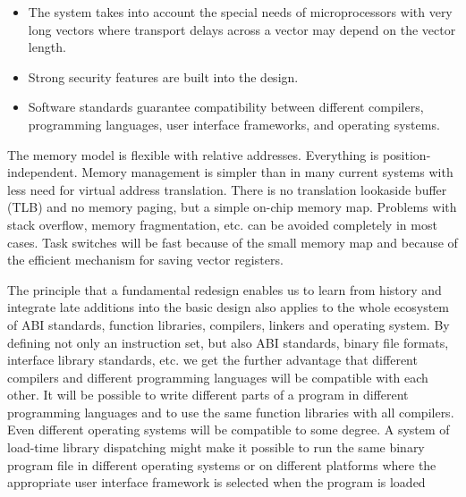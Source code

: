 \documentclass[forwardcom.tex]{subfiles}
\begin{document}
\begin{itemize}
\item The system takes into account the special needs of microprocessors with very long vectors where transport delays across a vector may depend on the vector length.

\item Strong security features are built into the design.

\item Software standards guarantee compatibility between different compilers, programming languages, user interface frameworks, and operating systems.

\end{itemize}

The memory model is flexible with relative addresses. Everything is position-independent. Memory management is simpler than in many current systems with less need for virtual address translation. There is no translation lookaside buffer (TLB) and no memory paging, but a simple on-chip memory map. Problems with stack overflow, memory fragmentation, etc. can be avoided completely in most cases. Task switches will be fast because of the small memory map and because of the efficient mechanism for saving vector registers. 
\vspace{2mm}

The principle that a fundamental redesign enables us to learn from history and integrate late additions into the basic design also applies to the whole ecosystem of ABI standards, function libraries, compilers, linkers and operating system. By defining not only an instruction set, but also ABI standards, binary file formats, interface library standards, etc. we get the further advantage that different compilers and different programming languages will be compatible with each other. It will be possible to write different parts of a program in different programming languages and to use the same function libraries with all compilers. Even different operating systems will be compatible to some degree. A system of load-time library dispatching might make it possible to run the same binary program file in different operating systems or on different platforms where the appropriate user interface framework is selected when the program is loaded
\vspace{2mm}
\end{document}
